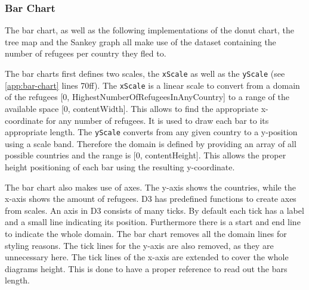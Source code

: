 \subsubsection{Bar Chart}
The bar chart, as well as the following implementations of the donut chart, the tree map and the Sankey graph all make use of the dataset containing the number of refugees per country they fled to.

The bar charts first defines two scales, the \texttt{xScale} as well as the \texttt{yScale} (see \ref{app:bar-chart} lines 70ff). The \texttt{xScale} is a linear scale to convert from a domain of the refugees [0, HighestNumberOfRefugeesInAnyCountry] to a range of the available space [0, contentWidth]. This allows to find the appropriate x-coordinate for any number of refugees. It is used to draw each bar to its appropriate length. The \texttt{yScale} converts from any given country to a y-position using a scale band. Therefore the domain is defined by providing an array of all possible countries and the range is [0, contentHeight]. This allows the proper height positioning of each bar using the resulting y-coordinate.

The bar chart also makes use of axes. The y-axis shows the countries, while the x-axis shows the amount of refugees. D3 has predefined functions to create axes from scales. An axis in D3 consists of many ticks. By default each tick has a label and a small line indicating its position. Furthermore there is a start and end line to indicate the whole domain. The bar chart removes all the domain lines for styling reasons. The tick lines for the y-axis are also removed, as they are unnecessary here. The tick lines of the x-axis are extended to cover the whole diagrams height. This is done to have a proper reference to read out the bars length.

